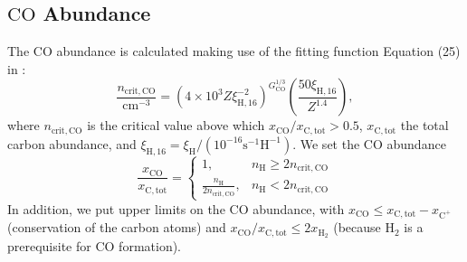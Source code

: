 \documentclass[iop,numberedappendix]{emulateapj}
\newcommand{\mr}{\mathrm}
\newcommand{\Ht}{\mathrm{H_2}}
\newcommand{\Ho}{\mathrm{H}}
\newcommand{\CO}{\mathrm{CO}}
\newcommand{\Cplus}{\mathrm{C^+}}
\begin{document}
\subsection{$\CO$ Abundance\label{section:CO}}
The $\CO$ abundance is calculated making use of the fitting function Equation
(25) in \citet{GOW2016}:
\begin{equation}\label{eq:CO_fit}
    \frac{n_\mr{crit, CO}}{\mr{cm^{-3}}} 
    = \left(4\times10^3 Z \xi_{\Ho,16}^{-2}\right)^{G_\CO^{1/3}}
    \left( \frac{50  \xi_{\Ho,16}}{Z^{1.4}}\right),
\end{equation}
where $n_\mr{crit, CO}$ is the critical value above which 
$x_\CO/x_\mr{C, tot} > 0.5$, $x_\mr{C, tot}$ the total carbon abundance, and
$\xi_{\Ho,16}=\xi_\Ho/(10^{-16}\mr{s^{-1}H^{-1}})$.
We set the $\CO$ abundance 
\begin{equation*}
    \frac{x_\CO}{x_\mr{C, tot}} =
    \begin{cases}
         1, & n_\Ho \geq 2 n_\mr{crit, CO}\\
         \frac{n_\Ho}{2 n_\mr{crit, CO}}, & n_\Ho < 2 n_\mr{crit, CO}
    \end{cases}
\end{equation*}
In addition, we put upper limits on the $\CO$ abundance, with 
$x_\CO \leq x_\mr{C, tot} - x_\Cplus$ (conservation of the carbon atoms)
and $x_\CO/x_\mr{C, tot} \leq 2 x_\Ht$
(because $\Ht$ is a prerequisite for $\CO$ formation).
\end{document}
